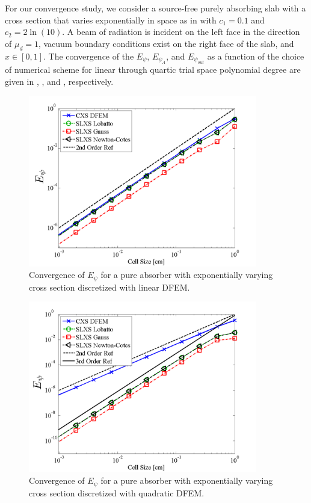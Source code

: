 For our convergence study, we consider a source-free purely absorbing slab with a cross section that varies exponentially in space as in  with $c_1 = 0.1$ and $c_2 = 2\ln(10)$.  
A beam of radiation is incident on the left face in the direction of $\mu_d=1$, vacuum boundary conditions exist on the right face of the slab, and $x\in[0, 1]$.  
The convergence of the $E_{\psi}$,  $E_{\psi_A}$, and $E_{\psi_{out}}$ as a function of the choice of numerical scheme for linear through quartic trial space polynomial degree are given in 
,  , and , respectively.  
\begin{figure}[!htp]
\centering
\includegraphics[width=10cm]{chapter3_variable_xs/P1_VarXS_E_psi_L2.png}
\caption{Convergence of $E_{\psi}$ for a pure absorber with exponentially varying cross section discretized with linear DFEM.}
\label{fig:varxs_psi_L2_p1}
\end{figure}
%
%
%
\begin{figure}[!hbp]
\centering
\includegraphics[width=10cm]{chapter3_variable_xs/P2_VarXS_E_psi_L2.png}
\caption{Convergence of $E_{\psi}$ for a pure absorber with exponentially varying cross section discretized with quadratic DFEM.}
\label{fig:varxs_psi_L2_p2}
\end{figure}


